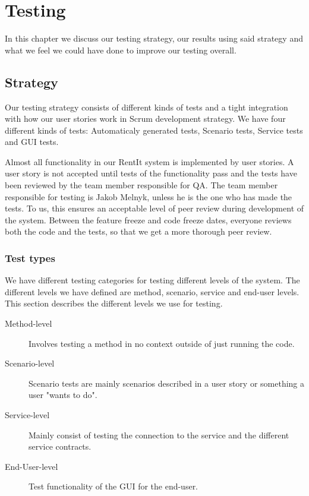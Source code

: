 \chapter{Testing}
\label{testing}
In this chapter we discuss our testing strategy, our results using said strategy and what we feel we could have done to improve our testing overall. 

\section{Strategy}
\label{testing_strategy}
Our testing strategy consists of different kinds of tests and a tight integration with how our user stories work in Scrum development strategy. We have four different kinds of tests: Automaticaly generated tests, Scenario tests, Service tests and GUI tests. 

Almost all functionality in our RentIt system is implemented by user stories. A user story is not accepted until tests of the functionality pass and the tests have been reviewed by the team member responsible for QA. The team member responsible for testing is Jakob Melnyk, unless he is the one who has made the tests. To us, this ensures an acceptable level of peer review during development of the system. Between the feature freeze and code freeze dates, everyone reviews both the code and the tests, so that we get a more thorough peer review.

\subsection{Test types}
\label{testing_strategy_types}
We have different testing categories for testing different levels of the system. The different levels we have defined are method, scenario, service and end-user levels. This section describes the different levels we use for testing.

\begin{description}
\item[Method-level] Involves testing a method in no context outside of just running the code. 
\item[Scenario-level] Scenario tests are mainly scenarios described in a user story or something a user "wants to do".
\item[Service-level] Mainly consist of testing the connection to the service and the different service contracts.
\item[End-User-level] Test functionality of the GUI for the end-user.
\end{description}


